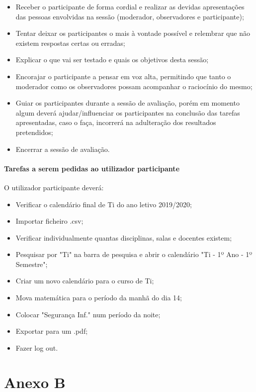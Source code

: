 \documentclass[11pt, twoside]{report}
\begin{document}
	\begin{itemize}
		\item Receber o participante de forma cordial e realizar as devidas apresentações das pessoas envolvidas na sessão (moderador, observadores e participante);
		\item Tentar deixar os participantes o mais à vontade possível e relembrar que não existem respostas certas ou erradas;
		\item Explicar o que vai ser testado e quais os objetivos desta sessão;
		\item Encorajar o participante a pensar em voz alta, permitindo que tanto o moderador como os observadores possam acompanhar o raciocínio do mesmo;
		\item Guiar os participantes durante a sessão de avaliação, porém em momento algum deverá ajudar/influenciar os participantes na conclusão das tarefas apresentadas, caso o faça, incorrerá na adulteração dos resultados pretendidos;
		\item Encerrar a sessão de avaliação.
	\end{itemize}
	
	\subsubsection*{Tarefas a serem pedidas ao utilizador participante}	
	O utilizador participante deverá:
	
	\begin{itemize}
		\item Verificar o calendário final de Ti do ano letivo 2019/2020;
		\item Importar ficheiro .csv;
		\item Verificar individualmente quantas disciplinas, salas e docentes existem;
		\item Pesquisar por "Ti" na barra de pesquisa e abrir o calendário "Ti - 1º Ano - 1º Semestre";
		\item Criar um novo calendário para o curso de Ti;
		\item Mova matemática para o período da manhã do dia 14;
		\item Colocar "Segurança Inf." num período da noite;
		\item Exportar para um .pdf;
		\item Fazer log out.
	\end{itemize}
	
	
	\chapter*{Anexo B}
\end{document}
